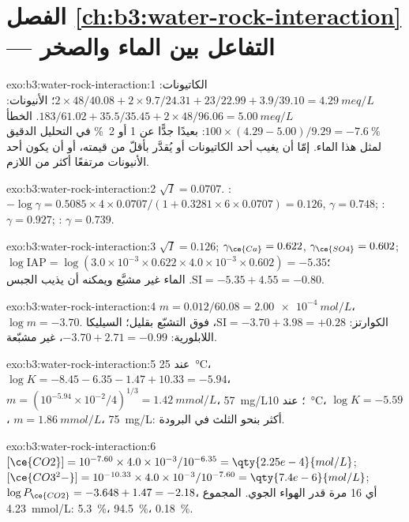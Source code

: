 \section*{الفصل \ref{ch:b3:water-rock-interaction} --- التفاعل بين الماء والصخر}

\begin{solution}{exo:b3:water-rock-interaction:1}
الكاتيونات: $2\times48/40.08 + 2\times9.7/24.31 + 23/22.99 + 3.9/39.10 =
\qty{4.29}{meq/L}$؛ الأنيونات: $183/61.02 + 35.5/35.45 + 2\times48/96.06 =
\qty{5.00}{meq/L}$. الخطأ $100\times(4.29 - 5.00)/9.29 = \qty{-7.6}{\percent}$:
بعيدًا جدًّا عن 1 أو \qty{2}{\percent} في التحليل الدقيق لمثل هذا الماء.
إمّا أن يغيب أحد الكاتيونات أو يُقدَّر بأقلّ من قيمته، أو أن يكون أحد الأنيونات مرتفعًا أكثر من اللازم.
\end{solution}

\begin{solution}{exo:b3:water-rock-interaction:2}
$\sqrt I = 0.0707$. : $-\log\gamma = 0.5085\times4\times0.0707/(1 +
0.3281\times6\times0.0707) = 0.126$, $\gamma = 0.748$; : $\gamma =
0.927$; : $\gamma = 0.739$.
\end{solution}

\begin{solution}{exo:b3:water-rock-interaction:3}
$\sqrt I = 0.126$; $\gamma_{\ce{Ca}} = 0.622$, $\gamma_{\ce{SO4}} = 0.602$;
$\log\mathrm{IAP} = \log(3.0\times10^{-3}\times0.622\times4.0\times10^{-3}
\times0.602) = -5.35$؛ $\mathrm{SI} = -5.35 + 4.55 = -0.80$. الماء
غير مشبَّع ويمكنه أن يذيب الجبس.
\end{solution}

\begin{solution}{exo:b3:water-rock-interaction:4}
$m = 0.012/60.08 = \qty{2.00e-4}{mol/L}$، $\log m = -3.70$. الكوارتز:
$\mathrm{SI} = -3.70 + 3.98 = +0.28$، فوق التشبّع بقليل؛ السيليكا
اللابلورية: $-3.70 + 2.71 = -0.99$، غير مشبّعة.
\end{solution}

\begin{solution}{exo:b3:water-rock-interaction:5}
عند \qty{25}{\celsius}، $\log K = -8.45 - 6.35 - 1.47 + 10.33 = -5.94$، $m =
(10^{-5.94}\times10^{-2}/4)^{1/3} = \qty{1.42}{mmol/L}$، \qty{57}{mg/L}؛ عند
\qty{10}{\celsius}، $\log K = -5.59$، $m = \qty{1.86}{mmol/L}$،
\qty{75}{mg/L}: أكثر بنحو الثلث في البرودة.
\end{solution}

\begin{solution}{exo:b3:water-rock-interaction:6}
$[\ce{CO2}] = 10^{-7.60}\times4.0\times10^{-3}/10^{-6.35} =
\qty{2.25e-4}{mol/L}$; $[\ce{CO3^2-}] = 10^{-10.33}\times4.0\times10^{-3}/
10^{-7.60} = \qty{7.4e-6}{mol/L}$; $\log P_{\ce{CO2}} = -3.648 + 1.47 =
-2.18$، أي 16 مرة قدر الهواء الجوي. المجموع \qty{4.23}{mmol/L}: 
\qty{5.3}{\percent}،  \qty{94.5}{\percent}، 
\qty{0.18}{\percent}.
\end{solution}

